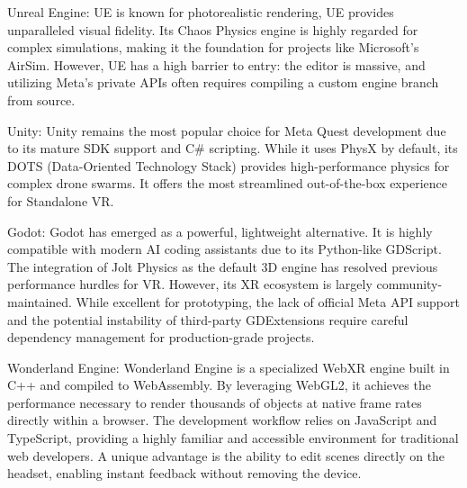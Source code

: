 Unreal Engine: UE is known for photorealistic rendering, UE provides unparalleled visual fidelity. Its Chaos Physics engine is highly regarded for complex simulations, making it the foundation for projects like Microsoft's AirSim. However, UE has a high barrier to entry: the editor is massive, and utilizing Meta's private APIs often requires compiling a custom engine branch from source.

Unity: Unity remains the most popular choice for Meta Quest development due to its mature SDK support and C\# scripting. While it uses PhysX by default, its DOTS (Data-Oriented Technology Stack) provides high-performance physics for complex drone swarms. It offers the most streamlined out-of-the-box experience for Standalone VR.

Godot: Godot has emerged as a powerful, lightweight alternative. It is highly compatible with modern AI coding assistants due to its Python-like GDScript. The integration of Jolt Physics as the default 3D engine has resolved previous performance hurdles for VR. However, its XR ecosystem is largely community-maintained. While excellent for prototyping, the lack of official Meta API support and the potential instability of third-party GDExtensions require careful dependency management for production-grade projects.

Wonderland Engine: Wonderland Engine is a specialized WebXR engine built in C++ and compiled to WebAssembly.  By leveraging WebGL2, it achieves the performance necessary to render thousands of objects at native frame rates directly within a browser. The development workflow relies on JavaScript and TypeScript, providing a highly familiar and accessible environment for traditional web developers. A unique advantage is the ability to edit scenes directly on the headset, enabling instant feedback without removing the device.


